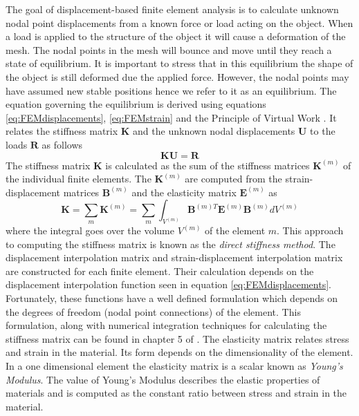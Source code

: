 \documentclass[11pt,a4paper]{report}
\begin{document}
The goal of displacement-based finite element analysis is to calculate
unknown nodal point displacements from a known force or load acting on the
object. When a load is applied to the structure of the object it will cause a
deformation of the mesh. The nodal points in the mesh will bounce and move
until they reach a state of equilibrium. It is important to stress that in this equilibrium the shape of the
object is still deformed due the applied force. However, the nodal points may have
assumed new stable positions hence we refer to it as an equilibrium. The
equation governing the equilibrium is derived using equations
\ref{eq:FEMdisplacements}, \ref{eq:FEMstrain} and the Principle of Virtual
Work \cite{FEMbook}. It relates the stiffness matrix $\mathbf{K}$ and the unknown nodal
displacements $\mathbf{U}$ to the loads $\mathbf{R}$ as follows
\begin{equation}\label{eq:FEMequilibrium}
\mathbf{K}\mathbf{U} = \mathbf{R}
\end{equation}
The stiffness matrix $\mathbf{K}$ is calculated as the sum of the stiffness
matrices $\mathbf{K}^{(m)}$ of the individual finite elements. The
$\mathbf{K}^{(m)}$ are
computed from the strain-displacement matrices $\mathbf{B}^{(m)}$ and the
elasticity matrix $\mathbf{E}^{(m)}$ as
\begin{equation}\label{eq:FEMstiffness}
\mathbf{K} = \sum_m \mathbf{K}^{(m)} = \sum_m \int_{V^{(m)}} \mathbf{B}^{(m)T}
  \mathbf{E}^{(m)} \mathbf{B}^{(m)} dV^{(m)}
\end{equation}
where the integral goes over the volume $V^{(m)}$ of the element $m$. This
approach to computing the stiffness matrix is known as the \textit{direct
  stiffness method}. The displacement interpolation matrix and strain-displacement
interpolation matrix are constructed for each finite element. Their calculation
depends on the displacement interpolation function seen in equation
\ref{eq:FEMdisplacements}. Fortunately, these functions have a well defined
formulation which depends on the degrees of freedom (nodal point connections) of
the element. This formulation, along with numerical integration techniques for
calculating the stiffness matrix can be found in chapter 5 of \cite{FEMbook}. The elasticity matrix relates stress and
strain in the material. Its form depends on the dimensionality of the
element. In a one dimensional element the elasticity matrix is a scalar known as
\textit{Young's Modulus}. The value of Young's Modulus describes the elastic
properties of materials and is computed as the constant ratio between stress and strain
in the material.
\end{document}
